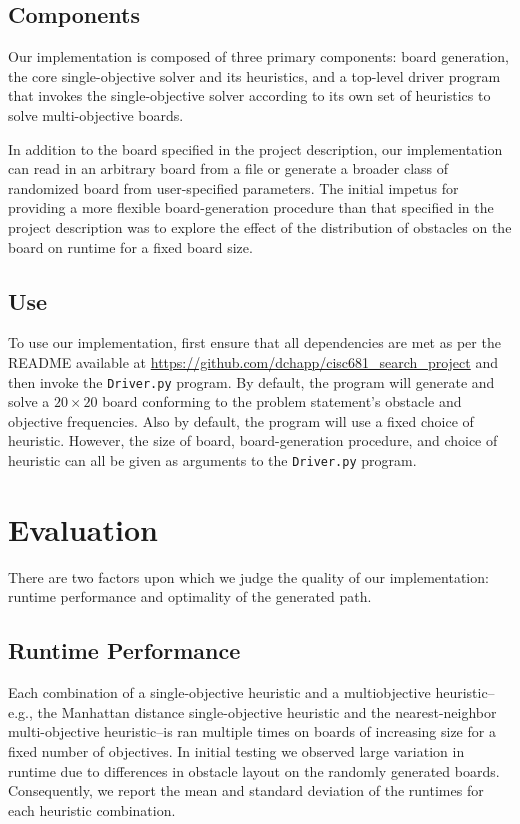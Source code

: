 \documentclass[12pt, conference, compsocconf]{IEEEtran}
\begin{document}
\subsection{Components}
Our implementation is composed of three primary components: board generation, the core single-objective solver and its heuristics, and a top-level driver program that invokes the single-objective solver according to its own set of heuristics to solve multi-objective boards. 

In addition to the board specified in the project description, our implementation can read in an arbitrary board from a file or generate a broader class of randomized board from user-specified parameters. 
The initial impetus for providing a more flexible board-generation procedure than that specified in the project description was to explore the effect of the distribution of obstacles on the board on runtime for a fixed board size.

\subsection{Use}
To use our implementation, first ensure that all dependencies are met as per the README available at \url{https://github.com/dchapp/cisc681_search_project} and then invoke the \texttt{Driver.py} program. 
By default, the program will generate and solve a $20 \times 20$ board conforming to the problem statement's obstacle and objective frequencies.
Also by default, the program will use a fixed choice of heuristic.
However, the size of board, board-generation procedure, and choice of heuristic can all be given as arguments to the \texttt{Driver.py} program. 

\section{Evaluation}
There are two factors upon which we judge the quality of our implementation: runtime performance and optimality of the generated path.  

\subsection{Runtime Performance}
Each combination of a single-objective heuristic and a multiobjective heuristic--e.g., the Manhattan distance single-objective heuristic and the nearest-neighbor multi-objective heuristic--is ran multiple times on boards of increasing size for a fixed number of objectives.
In initial testing we observed large variation in runtime due to differences in obstacle layout on the randomly generated boards. 
Consequently, we report the mean and standard deviation of the runtimes for each heuristic combination. 
\end{document}
